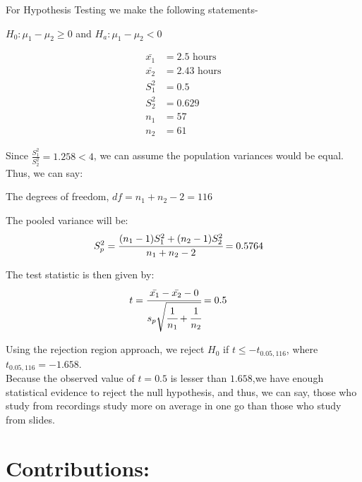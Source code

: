 \documentclass[12pt,onecolumn,letterpaper]{article}
\begin{document}
For Hypothesis Testing we make the following statements-
\begin{center}
    $ H_0 : \mu_1 - \mu_2 \geq 0$ and $H_a : \mu_1 - \mu_2 < 0$  \\
\end{center}

\begin{align}
    \bar{x_1} &= 2.5 \text{ hours}\\ 
    \bar{x_2} &= 2.43 \text{ hours} \\ 
    S^2_1 &= 0.5\\
    S^2_2 &= 0.629\\
    n_1 &= 57\\
    n_2 &= 61
\end{align}

Since $\frac{S_1^2}{S_2^2} = 1.258 < 4$, we can assume the population variances would be equal. Thus, we can say: \par The degrees of freedom, $df = n_1 + n_2 -2 = 116$

 The pooled variance will be:
 \begin{align}
     S_p^2 &= \cfrac{(n_1-1)S_1^2 + (n_2-1)S_2^2}{n_1+n_2-2} = 0.5764
 \end{align}
      

The test statistic is then given by:
 \begin{align}
      t &= \cfrac{\bar{x_1} - \bar{x_2} - 0}{s_p\sqrt{\cfrac{1}{n_1} + \cfrac{1}{n_2}}} = 0.5
 \end{align}

 \par
 Using the rejection region approach, we reject $H_0$ if $t \leq -t_{0.05, 116}$, where $t_{0.05,116} = -1.658$.\\ 
 Because the observed value of $t=0.5$ is lesser than $1.658$,we have enough statistical evidence to reject the null hypothesis, and thus, we can say, those who study from recordings study more on average in one go than those who study from slides.

\newpage
\section {Contributions:}
\end{document}
